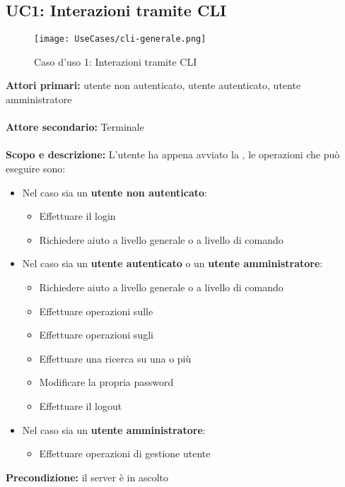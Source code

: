 \documentclass{scalatekids-article}
\begin{document}
\subsection{UC1: Interazioni tramite CLI}
\begin{figure}[H]
  \begin{center}
    \texttt{[image: UseCases/cli-generale.png]}
    \caption*{Caso d'uso 1: Interazioni tramite CLI}
  \end{center}
\end{figure}
\textbf{Attori primari:} utente non autenticato, utente autenticato, utente amministratore\\ \\
\textbf{Attore secondario:} Terminale\\ \\
\textbf{Scopo e descrizione:} L'utente ha appena avviato la , le operazioni che può eseguire sono:
\begin{itemize}
\item Nel caso sia un \textbf{utente non autenticato}:
  \begin{itemize}
  \item Effettuare il login
  \item Richiedere aiuto a livello generale o a livello di comando
  \end{itemize}
\item Nel caso sia un \textbf{utente autenticato} o un \textbf{utente amministratore}:
  \begin{itemize}
  \item Richiedere aiuto a livello generale o a livello di comando
  \item Effettuare operazioni sulle 
  \item Effettuare operazioni sugli 
  \item Effettuare una ricerca su una o più 
  \item Modificare la propria password
  \item Effettuare il logout
  \end{itemize}
\item Nel caso sia un \textbf{utente amministratore}:
  \begin{itemize}
  \item Effettuare operazioni di gestione utente
  \end{itemize}
\end{itemize}
\textbf{Precondizione:} il server è in ascolto\\ \\
\end{document}
